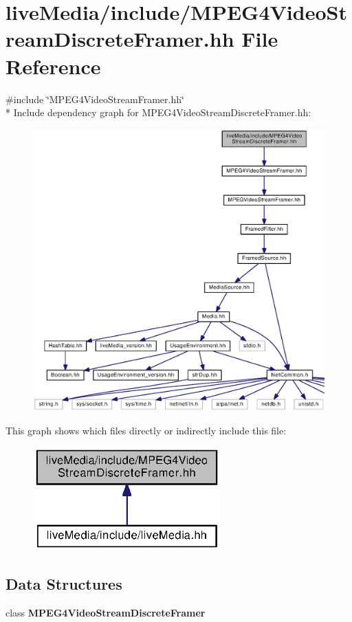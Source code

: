 \section{live\+Media/include/\+M\+P\+E\+G4\+Video\+Stream\+Discrete\+Framer.hh File Reference}
\label{MPEG4VideoStreamDiscreteFramer_8hh}
{\ttfamily \#include \char`\"{}M\+P\+E\+G4\+Video\+Stream\+Framer.\+hh\char`\"{}}\\*
Include dependency graph for M\+P\+E\+G4\+Video\+Stream\+Discrete\+Framer.\+hh\+:
\nopagebreak
\begin{figure}[H]
\begin{center}
\leavevmode
\includegraphics[width=350pt]{MPEG4VideoStreamDiscreteFramer_8hh__incl}
\end{center}
\end{figure}
This graph shows which files directly or indirectly include this file\+:
\nopagebreak
\begin{figure}[H]
\begin{center}
\leavevmode
\includegraphics[width=205pt]{MPEG4VideoStreamDiscreteFramer_8hh__dep__incl}
\end{center}
\end{figure}
\subsection*{Data Structures}
\begin{DoxyCompactItemize}
\item 
class {\bf M\+P\+E\+G4\+Video\+Stream\+Discrete\+Framer}
\end{DoxyCompactItemize}

